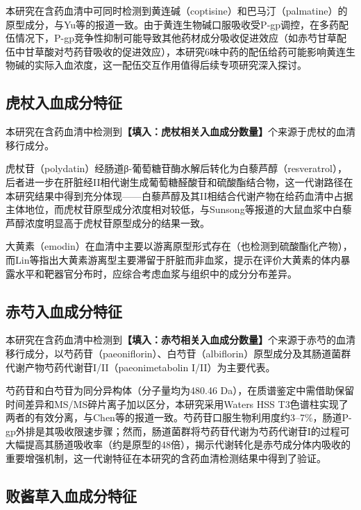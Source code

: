 \documentclass[12pt,a4paper,UTF8,openany]{ctexbook}
\begin{document}
本研究在含药血清中可同时检测到黄连碱（coptisine）和巴马汀（palmatine）的原型成分，与Yu等\cite{Yu2010}的报道一致。由于黄连生物碱口服吸收受P-gp调控，在多药配伍情况下，P-gp竞争性抑制可能导致其他药材成分吸收促进效应（如赤芍甘草配伍中甘草酸对芍药苷吸收的促进效应\cite{QiuLab2019}），本研究6味中药的配伍给药可能影响黄连生物碱的实际入血浓度，这一配伍交互作用值得后续专项研究深入探讨。

\subsection{虎杖入血成分特征}

本研究在含药血清中检测到\textbf{【填入：虎杖相关入血成分数量】}个来源于虎杖的血清移行成分。

虎杖苷（polydatin）经肠道β-葡萄糖苷酶水解后转化为白藜芦醇（resveratrol），后者进一步在肝脏经II相代谢生成葡萄糖醛酸苷和硫酸酯结合物\cite{Fang2009,Lin2012}，这一代谢路径在本研究结果中得到充分体现——白藜芦醇及其II相结合代谢产物在给药血清中占据主体地位，而虎杖苷原型成分浓度相对较低，与Sunsong等\cite{Sunsong2021}报道的大鼠血浆中白藜芦醇浓度明显高于虎杖苷原型成分的结果一致。

大黄素（emodin）在血清中主要以游离原型形式存在（也检测到硫酸酯化产物），而Lin等\cite{Lin2012}指出大黄素游离型主要滞留于肝脏而非血浆，提示在评价大黄素的体内暴露水平和靶器官分布时，应综合考虑血浆与组织中的成分分布差异。

\subsection{赤芍入血成分特征}

本研究在含药血清中检测到\textbf{【填入：赤芍相关入血成分数量】}个来源于赤芍的血清移行成分，以芍药苷（paeoniflorin）、白芍苷（albiflorin）原型成分及其肠道菌群代谢产物芍药代谢苷I/II（paeonimetabolin I/II）为主要代表。

芍药苷和白芍苷为同分异构体（分子量均为480.46 Da），在质谱鉴定中需借助保留时间差异和MS/MS碎片离子加以区分，本研究采用Waters HSS T3色谱柱实现了两者的有效分离，与Chen等\cite{Chen2016P}的报道一致。芍药苷口服生物利用度约3--7\%，肠道P-gp外排是其吸收限速步骤\cite{Molecules2022}；然而，肠道菌群将芍药苷代谢为芍药代谢苷I的过程可大幅提高其肠道吸收率（约是原型的48倍），揭示代谢转化是赤芍成分体内吸收的重要增强机制，这一代谢特征在本研究的含药血清检测结果中得到了验证。

\subsection{败酱草入血成分特征}
\end{document}
